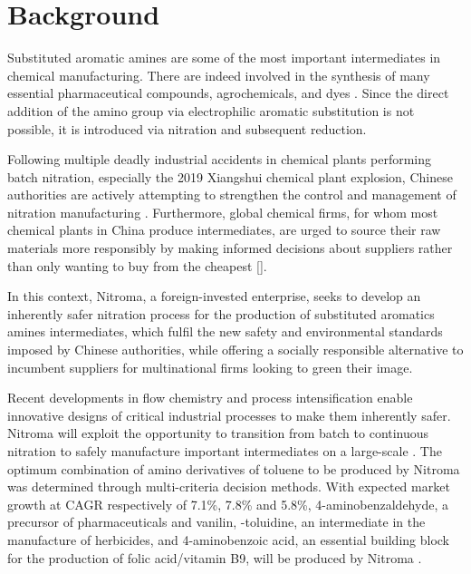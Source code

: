 \section{Background}

Substituted aromatic amines are some of the most important intermediates in chemical manufacturing. There are indeed involved in the synthesis of many essential pharmaceutical compounds, agrochemicals, and dyes \cite{vogt_amines_2000}. Since the direct addition of the amino group via electrophilic aromatic substitution is not possible, it is introduced via nitration and subsequent reduction. 

Following multiple deadly industrial accidents in chemical plants performing batch nitration, especially the 2019 Xiangshui chemical plant explosion, Chinese authorities are actively attempting to strengthen the control and management of nitration manufacturing \cite{el_diario_china_2019}. Furthermore, global chemical firms, for whom most chemical plants in China produce intermediates, are urged to source their raw materials more responsibly by making informed decisions about suppliers rather than only wanting to buy from the cheapest [].

In this context, Nitroma, a foreign-invested enterprise, seeks to develop an inherently safer nitration process for the production of substituted aromatics amines intermediates, which fulfil the new safety and environmental standards imposed by Chinese authorities, while offering a socially responsible alternative to incumbent suppliers for multinational firms looking to green their image. 

Recent developments in flow chemistry and process intensification enable innovative designs of critical industrial processes to make them inherently safer. Nitroma will exploit the opportunity to transition  from batch to continuous nitration to safely manufacture important intermediates on a large-scale \cite{di_miceli_raimondi_safety_2015}. The optimum combination of amino derivatives of toluene to be produced by Nitroma was determined through multi-criteria decision methods.
With expected market growth at CAGR respectively of 7.1\%, 7.8\% and 5.8\%, 4-aminobenzaldehyde, a precursor of pharmaceuticals and vanilin, \ortho-toluidine, an intermediate in the manufacture of herbicides, and 4-aminobenzoic acid, an essential building block for the production of folic acid/vitamin B9, will be produced by Nitroma  \cite{bowers_toluidines_2000,bruhne_benzaldehyde_2011,maki_benzoic_2000}. 

